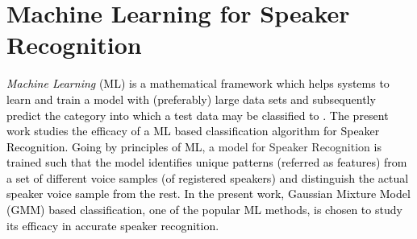\documentclass{article}
\begin{document}
{\section{\textbf{{Machine Learning for Speaker Recognition}}}
\label{MLforSR}
 \textcolor{black}{\textit{Machine Learning} (ML) is a mathematical framework which helps systems to learn and train a model with (preferably) large data sets and subsequently predict the category into which a test data may be classified to \cite{4}.} 
 \textcolor{black}{The present work studies the efficacy of a ML based classification algorithm for Speaker Recognition. Going by principles of ML}, a model for Speaker Recognition \textcolor{black}{is trained such that the model identifies unique patterns (referred as features) from a set of different voice samples (of registered speakers) and distinguish the actual speaker voice sample from the rest.} \textcolor{black}{In the present work, Gaussian Mixture Model (GMM) based classification, one of the popular ML methods, is chosen to study its efficacy in accurate speaker recognition.}
}
\end{document}
